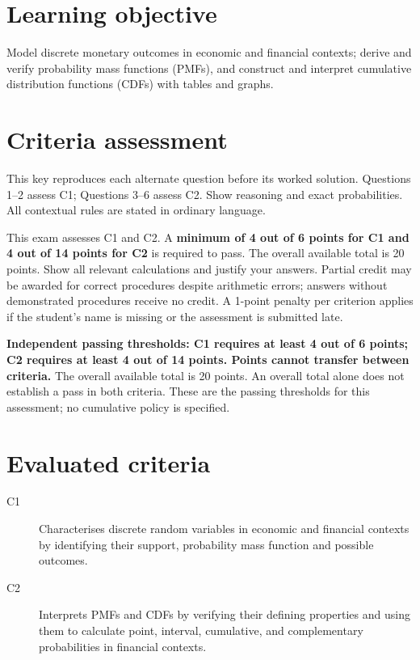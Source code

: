 \maketitle
\small
\setlength{\topsep}{3pt}
\setcounter{tocdepth}{1}
\label{toc}
\tableofcontents
\section*{Learning objective}
Model discrete monetary outcomes in economic and financial contexts; derive and verify probability mass functions (PMFs), and construct and interpret cumulative distribution functions (CDFs) with tables and graphs.
\section*{Criteria assessment}
This key reproduces each alternate question before its worked solution. Questions 1--2 assess C1; Questions 3--6 assess C2. Show reasoning and exact probabilities. All contextual rules are stated in ordinary language.

This exam assesses C1 and C2. A \textbf{minimum of 4 out of 6 points for C1 and 4 out of 14 points for C2} is required to pass. The overall available total is 20 points. Show all relevant calculations and justify your answers. Partial credit may be awarded for correct procedures despite arithmetic errors; answers without demonstrated procedures receive no credit. A 1-point penalty per criterion applies if the student's name is missing or the assessment is submitted late.

\textbf{Independent passing thresholds: C1 requires at least 4 out of 6 points; C2 requires at least 4 out of 14 points. Points cannot transfer between criteria.} The overall available total is 20 points. An overall total alone does not establish a pass in both criteria. These are the passing thresholds for this assessment; no cumulative policy is specified.
\section*{Evaluated criteria}
\begin{description}
\item[C1] Characterises discrete random variables in economic and financial contexts by identifying their support, probability mass function and possible outcomes.
\item[C2] Interprets PMFs and CDFs by verifying their defining properties and using them to calculate point, interval, cumulative, and complementary probabilities in financial contexts.
\end{description}

